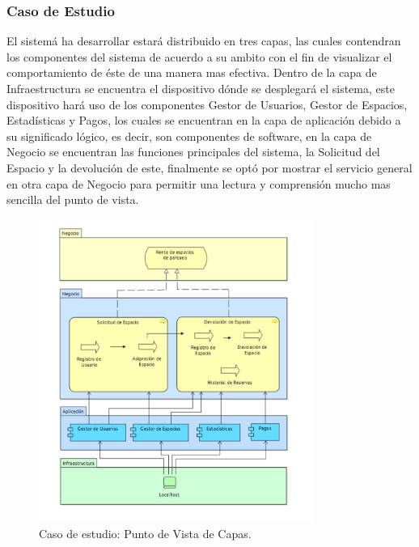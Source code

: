 \subsubsection{Caso de Estudio}
El sistemá ha desarrollar estará distribuido en tres capas, las cuales contendran los componentes del sistema de acuerdo a su ambito con el fin de visualizar el comportamiento de éste de una manera mas efectiva. Dentro de la capa de Infraestructura se encuentra el dispositivo dónde se desplegará el sistema, este dispositivo hará uso de los componentes Gestor de Usuarios, Gestor de Espacios, Estadísticas y Pagos, los cuales se encuentran en la capa de aplicación debido a su significado lógico, es decir, son componentes de software, en la capa de Negocio se encuentran las funciones principales del sistema, la Solicitud del Espacio y la devolución de este, finalmente se optó por mostrar el servicio general en otra capa de Negocio para permitir una lectura y comprensión mucho mas sencilla del punto de vista.
\begin{figure}[H]
	\centering
	\includegraphics[width=0.8\textwidth]{imagenes/Caso_Estudio/Tecnologia/capas_infraestructura.PDF}
	\caption{Caso de estudio: Punto de Vista de Capas.}
	\label{fig:gap_analysis}
\end{figure}

